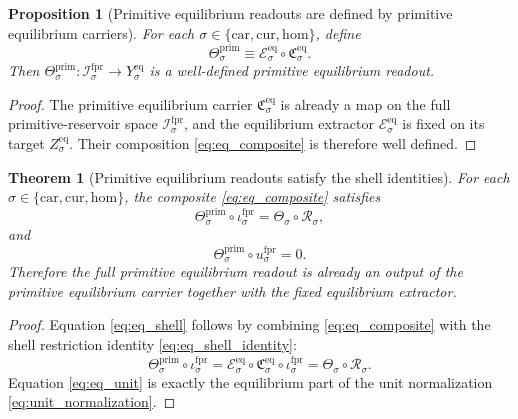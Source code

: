 \documentclass[11pt]{article}
\newcommand{\Car}{\mathrm{car}}
\newcommand{\Cur}{\mathrm{cur}}
\newcommand{\Hom}{\mathrm{hom}}
\newcommand{\ForPrimSpace}[1]{\mathcal I_{#1}^{\mathrm{fpr}}}
\newcommand{\ForPrimInc}[1]{\iota_{#1}^{\mathrm{fpr}}}
\newcommand{\ForPrimUnit}[1]{u_{#1}^{\mathrm{fpr}}}
\newcommand{\Reduction}[1]{\mathcal R_{#1}}
\newcommand{\ObsTheta}[1]{\Theta_{#1}}
\newcommand{\PrimTheta}[1]{\Theta_{#1}^{\mathrm{prim}}}
\newcommand{\EqCarrier}[1]{\mathfrak C_{#1}^{\mathrm{eq}}}
\newcommand{\EqExtract}[1]{\mathscr E_{#1}^{\mathrm{eq}}}
\newtheorem{proposition}{Proposition}
\newtheorem{theorem}{Theorem}
\begin{document}
\begin{proposition}[Primitive equilibrium readouts are defined by primitive equilibrium carriers]
\label{prop:eqdef}
For each \(\sigma\in\{\Car,\Cur,\Hom\}\), define
\begin{equation}
\PrimTheta{\sigma}
\equiv
\EqExtract{\sigma}\circ \EqCarrier{\sigma}.
\label{eq:eq_composite}
\end{equation}
Then \(\PrimTheta{\sigma}:\ForPrimSpace{\sigma}\to Y_{\sigma}^{\mathrm{eq}}\) is a well-defined primitive equilibrium readout.
\end{proposition}

\begin{proof}
The primitive equilibrium carrier \(\EqCarrier{\sigma}\) is already a map on the full primitive-reservoir space \(\ForPrimSpace{\sigma}\), and the equilibrium extractor \(\EqExtract{\sigma}\) is fixed on its target \(Z_{\sigma}^{\mathrm{eq}}\). Their composition \eqref{eq:eq_composite} is therefore well defined.
\end{proof}

\begin{theorem}[Primitive equilibrium readouts satisfy the shell identities]
\label{thm:eq}
For each \(\sigma\in\{\Car,\Cur,\Hom\}\), the composite \eqref{eq:eq_composite} satisfies
\begin{equation}
\PrimTheta{\sigma}\circ \ForPrimInc{\sigma}
=
\ObsTheta{\sigma}\circ \Reduction{\sigma},
\label{eq:eq_shell}
\end{equation}
and
\begin{equation}
\PrimTheta{\sigma}\circ \ForPrimUnit{\sigma}=0.
\label{eq:eq_unit}
\end{equation}
Therefore the full primitive equilibrium readout is already an output of the primitive equilibrium carrier together with the fixed equilibrium extractor.
\end{theorem}

\begin{proof}
Equation \eqref{eq:eq_shell} follows by combining \eqref{eq:eq_composite} with the shell restriction identity \eqref{eq:eq_shell_identity}:
\[
\PrimTheta{\sigma}\circ \ForPrimInc{\sigma}
=
\EqExtract{\sigma}\circ \EqCarrier{\sigma}\circ \ForPrimInc{\sigma}
=
\ObsTheta{\sigma}\circ \Reduction{\sigma}.
\]
Equation \eqref{eq:eq_unit} is exactly the equilibrium part of the unit normalization \eqref{eq:unit_normalization}.
\end{proof}
\end{document}
